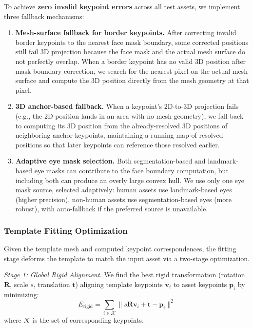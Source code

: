 \documentclass[acmtog,anonymous,review]{acmart}
\begin{document}
To achieve \textbf{zero invalid keypoint errors} across all test assets, we implement three fallback mechanisms:
\begin{enumerate}
  \item \textbf{Mesh-surface fallback for border keypoints.} After correcting invalid border keypoints to the nearest face mask boundary, some corrected positions still fail 3D projection because the face mask and the actual mesh surface do not perfectly overlap. When a border keypoint has no valid 3D position after mask-boundary correction, we search for the nearest pixel on the actual mesh surface and compute the 3D position directly from the mesh geometry at that pixel.
  \item \textbf{3D anchor-based fallback.} When a keypoint's 2D-to-3D projection fails (e.g., the 2D position lands in an area with no mesh geometry), we fall back to computing its 3D position from the already-resolved 3D positions of neighboring anchor keypoints, maintaining a running map of resolved positions so that later keypoints can reference those resolved earlier.
  \item \textbf{Adaptive eye mask selection.} Both segmentation-based and landmark-based eye masks can contribute to the face boundary computation, but including both can produce an overly large convex hull. We use only one eye mask source, selected adaptively: human assets use landmark-based eyes (higher precision), non-human assets use segmentation-based eyes (more robust), with auto-fallback if the preferred source is unavailable.
\end{enumerate}

\subsubsection{Template Fitting Optimization}

Given the template mesh and computed keypoint correspondences, the fitting stage deforms the template to match the input asset via a two-stage optimization.

\emph{Stage 1: Global Rigid Alignment.} We find the best rigid transformation (rotation $\mathbf{R}$, scale $s$, translation $\mathbf{t}$) aligning template keypoints $\mathbf{v}_i$ to asset keypoints $\mathbf{p}_i$ by minimizing:
\begin{equation}
  E_{\text{rigid}} = \sum_{i \in \mathcal{K}} \| s\mathbf{R}\mathbf{v}_i + \mathbf{t} - \mathbf{p}_i \|^2
\end{equation}
where $\mathcal{K}$ is the set of corresponding keypoints.
\end{document}
